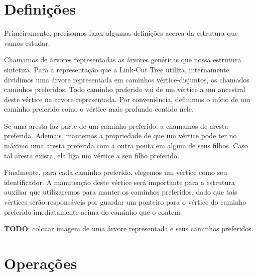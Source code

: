 \section{Definições}
\label{sec:lct-definicoes}

Primeiramente, precisamos fazer algumas definições acerca da estrutura que vamos estudar.

Chamamos de árvores representadas as árvores genéricas que nossa estrutura sintetiza. Para a representação que a Link-Cut Tree utiliza, internamente dividimos uma árvore representada em caminhos vértice-disjuntos, os chamados caminhos preferidos. Todo caminho preferido vai de um vértice a um ancestral deste vértice na arvore representada. Por conveniência, definimos o início de um caminho preferido como o vértice mais profundo contido nele.

Se uma aresta faz parte de um caminho preferido, a chamamos de aresta preferida. Ademais, mantemos a propriedade de que um vértice pode ter no máximo uma aresta preferida com a outra ponta em algum de seus filhos. Caso tal aresta exista, ela liga um vértice a seu filho preferido.


Finalmente, para cada caminho preferido, elegemos um vértice como seu identificador. A manutenção deste vértice será importante para a estrutura auxiliar que utilizaremos para manter os caminhos preferidos, dado que tais vértices serão responsáveis por guardar um ponteiro para o vértice do caminho preferido imediatamente acima do caminho que o contem.

\begin{center}
    \textbf{TODO}: colocar imagem de uma árvore representada e seus caminhos preferidos.
\end{center}

\section{Operações}
\label{sec:lct-operacoes}

